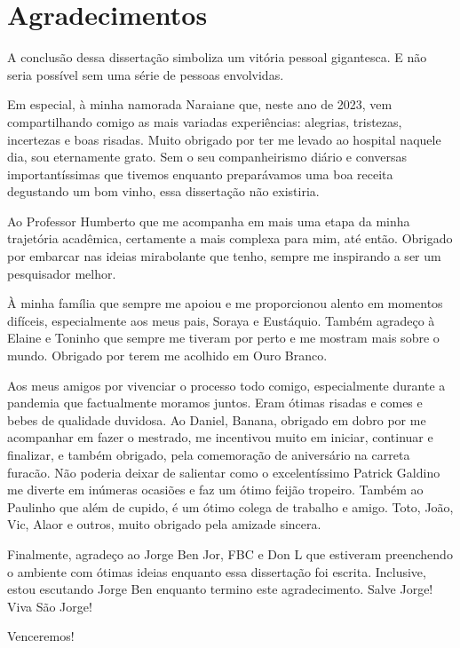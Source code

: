 \chapter*{Agradecimentos}
\begin{center}
	\normalsize
	A conclusão dessa dissertação simboliza um vitória pessoal gigantesca. E não seria possível sem uma série de pessoas envolvidas. 
 
    Em especial, à minha namorada Naraiane que, neste ano de 2023, vem compartilhando comigo as mais variadas experiências: alegrias, tristezas, incertezas e boas risadas. Muito obrigado por ter me levado ao hospital naquele dia, sou eternamente grato.
    Sem o seu companheirismo diário e conversas importantíssimas que tivemos enquanto preparávamos uma boa receita degustando um bom vinho, essa dissertação não existiria.

    Ao Professor Humberto que me acompanha em mais uma etapa da minha trajetória acadêmica, certamente a mais complexa para mim, até então. Obrigado por embarcar nas ideias mirabolante que tenho, sempre me inspirando a ser um pesquisador melhor.

    À minha família que sempre me apoiou e me proporcionou alento em momentos difíceis, especialmente aos meus pais, Soraya e Eustáquio. Também agradeço à Elaine e Toninho que sempre me tiveram por perto e me mostram mais sobre o mundo. Obrigado
    por terem me acolhido em Ouro Branco.

    Aos meus amigos por vivenciar o processo todo comigo, especialmente durante a pandemia que factualmente moramos juntos. Eram ótimas risadas e comes e bebes de qualidade duvidosa. Ao Daniel, Banana, obrigado em dobro por me acompanhar em fazer o mestrado, me incentivou muito em iniciar, continuar e finalizar, e também obrigado, pela comemoração de aniversário na carreta furacão. Não poderia deixar de salientar como o excelentíssimo Patrick Galdino me diverte em inúmeras ocasiões e faz um ótimo feijão tropeiro. Também ao 
    Paulinho que além de cupido, é um ótimo colega de trabalho e amigo. Toto, João, Vic, Alaor e outros, muito obrigado pela amizade sincera.

    Finalmente, agradeço ao Jorge Ben Jor, FBC e Don L que estiveram preenchendo o ambiente com ótimas ideias 
    enquanto essa dissertação foi escrita. Inclusive, estou escutando Jorge Ben enquanto termino este agradecimento. Salve Jorge! Viva São Jorge!

    Venceremos!
	
\end{center}

 
